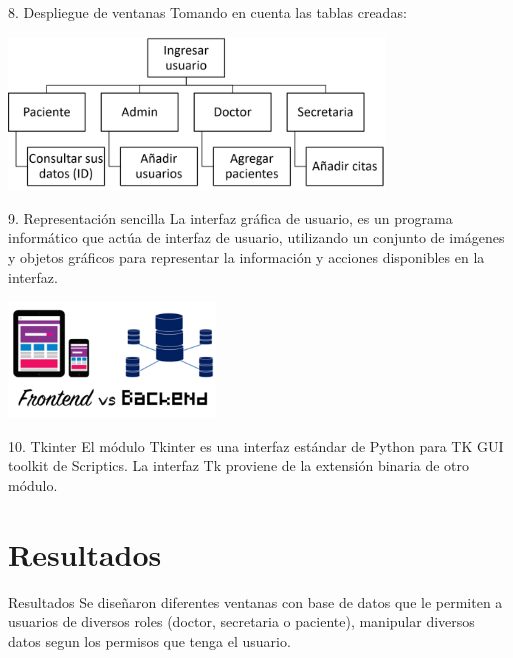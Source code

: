 \documentclass[10pt]{beamer}
\begin{document}
\begin{frame}{8. Despliegue de ventanas}
Tomando en cuenta las tablas creadas:

\centering
\includegraphics[width=10cm]{PYTHON1.png}
\end{frame}

\begin{frame}{9. Representación sencilla}
La interfaz gráfica de usuario, es un programa informático que actúa de interfaz de usuario, utilizando un conjunto de imágenes y objetos gráficos para representar la información y acciones disponibles en la interfaz. 

\centering
\includegraphics[width=5.5cm]{frontend.png}
\end{frame}

\begin{frame}{10. Tkinter}
El módulo Tkinter es una interfaz estándar de Python para TK GUI toolkit de Scriptics. 
La interfaz Tk proviene de la extensión binaria de otro módulo. 

\end{frame}

\section{Resultados}
\begin{frame}{Resultados}
Se diseñaron diferentes ventanas con base de datos que le permiten a usuarios de diversos roles (doctor, secretaria o paciente), manipular diversos datos segun los permisos que tenga el usuario.
\end{frame}
\end{document}
